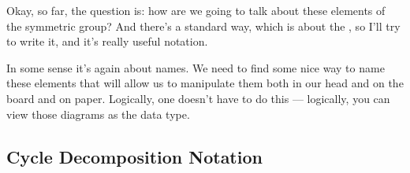 \begin{speech}[01:06:04 - 01:06:39]
Okay, so far, the question is: how are we going to talk about these elements of the symmetric group? And there's a standard way, which is about the , so I'll try to write it, and it's really useful notation.

In some sense it's again about names. We need to find some nice way to name these elements that will allow us to manipulate them both in our head and on the board and on paper. Logically, one doesn't have to do this --- logically, you can view those diagrams as the data type. 
\end{speech}

\begin{hidden}
\end{hidden}

\subsection{Cycle Decomposition Notation}

